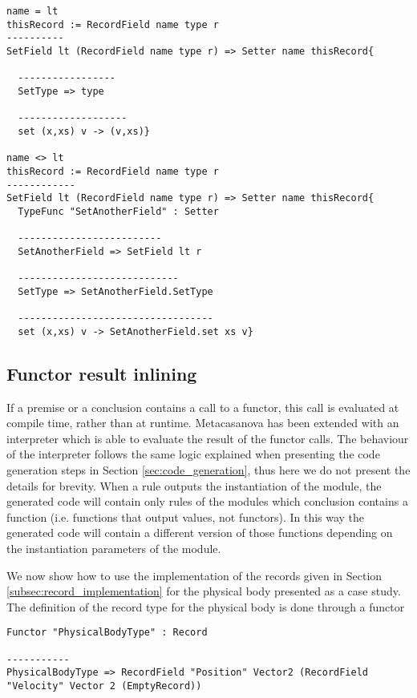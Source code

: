 \begin{lstlisting}
name = lt
thisRecord := RecordField name type r
----------
SetField lt (RecordField name type r) => Setter name thisRecord{
  
  -----------------
  SetType => type
  
  -------------------
  set (x,xs) v -> (v,xs)}
  
name <> lt
thisRecord := RecordField name type r
------------
SetField lt (RecordField name type r) => Setter name thisRecord{
  TypeFunc "SetAnotherField" : Setter
  
  -------------------------
  SetAnotherField => SetField lt r
  
  ----------------------------
  SetType => SetAnotherField.SetType
  
  ----------------------------------
  set (x,xs) v -> SetAnotherField.set xs v}
\end{lstlisting}

\subsection{Functor result inlining}
If a premise or a conclusion contains a call to a functor, this call is evaluated at compile time, rather than at runtime. Metacasanova has been extended with an interpreter which is able to evaluate the result of the functor calls. The behaviour of the interpreter follows the same logic explained when presenting the code generation steps in Section \ref{sec:code_generation}, thus here we do not present the details for brevity. When a rule outputs the instantiation of the module, the generated code will contain only rules of the modules which conclusion contains a function (i.e. functions that output values, not functors). In this way the generated code will contain a different version of those functions depending on the instantiation parameters of the module.

We now show how to use the implementation of the records given in Section \ref{subsec:record_implementation} for the physical body presented as a case study.
The definition of the record type for the physical body is done through a functor

\begin{lstlisting}
Functor "PhysicalBodyType" : Record

-----------
PhysicalBodyType => RecordField "Position" Vector2 (RecordField "Velocity" Vector 2 (EmptyRecord))
\end{lstlisting}

